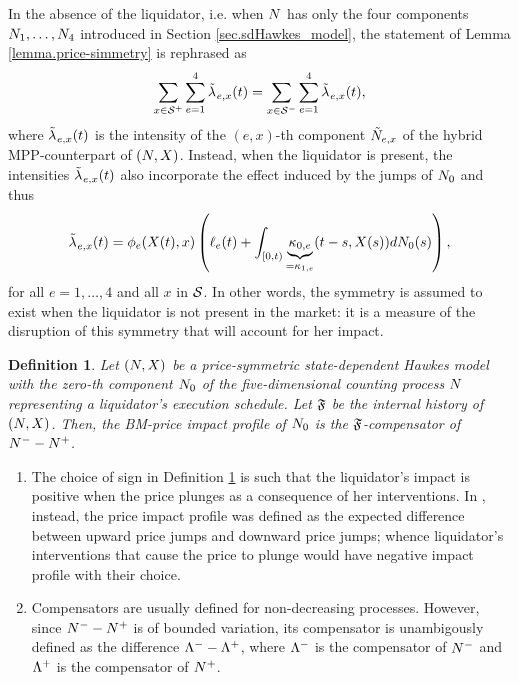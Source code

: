 \documentclass[10pt]{article}
\newtheorem{defi}[thm]{Definition}
\begin{document}
 In the absence of the liquidator, i.e. when $\multiCountingProc$ has only the four components $\countingProc[1], \dots, \countingProc[4]$ introduced in Section \ref{sec.sdHawkes_model}, the statement of Lemma \ref{lemma.price-simmetry} is rephrased as 
 \begin{equation*}
  \sum_{x\in\inflationarySpace}\sum_{e=1}^{4}\hybridIntensity_{e,x}(t)
  =
  \sum_{x\in\deflationarySpace}\sum_{e=1}^{4}\hybridIntensity_{e,x}(t),
 \end{equation*}
where $\hybridIntensity_{e,x}(t)$ is the intensity of the $(e,x)$-th component $\hybridHawkes_{e,x}$ of the hybrid MPP-counterpart of $\sdHawkesPair$. Instead, when the liquidator is present, the intensities $\hybridIntensity_{e,x}(t)$ also incorporate the effect  induced by the jumps of $\countingProc[0]$ and thus 
\begin{equation*}
 \hybridIntensity_{e,x}(t) = \transProb_e(\stateVariable(t),x)
 \left(\ell_{e}(t) + \int_{[0,t)}\underbrace{\hawkesKernel_{0,e}}_{=\hawkesKernel_{1,e}}(t-s,\stateVariable(s))d\countingProc[0](s)
 \right),
\end{equation*}
for all $e=1,\dots,4$ and all $x$ in $\stateSpace$. 
In other words, the symmetry is assumed to exist when the liquidator is not present in the market: it is a measure of the disruption of this symmetry that will account for her impact.

\begin{defi}\label{def.BM_impact}
 Let $\sdHawkesPair$ be a price-symmetric state-dependent Hawkes model with the zero-th component $\countingProc[0]$ of the five-dimensional counting process $\multiCountingProc$ representing a liquidator's execution schedule. Let $\internalHistory$ be the internal history of $\sdHawkesPair$. Then, the BM-price impact profile of $\countingProc[0]$ is the $\internalHistory$-compensator of $\Nminus - \Nplus$. 
\end{defi}

\begin{remark}
\begin{enumerate}[label=\roman{*}.]
 \item 
 The choice of sign in Definition \ref{def.BM_impact} is such that the liquidator's impact is positive when the price plunges as a consequence of her interventions. In \citealp{BM14haw}, instead, the price impact profile was defined as the expected difference between upward price jumps and downward price jumps; whence liquidator's interventions that cause the price to plunge would have negative impact profile with their choice. 
 \item 
 Compensators are usually defined for non-decreasing processes. However, since $\countingProc[]^{-} - \countingProc[]^{+}$ is of bounded variation, its compensator is unambigously defined as the difference $\compensator^{-}-\compensator^{+}$, where $\compensator^{-}$ is the compensator of $\Nminus$ and $\compensator^{+}$ is the compensator of $\Nplus$.
\end{enumerate}
\end{remark}
\end{document}
